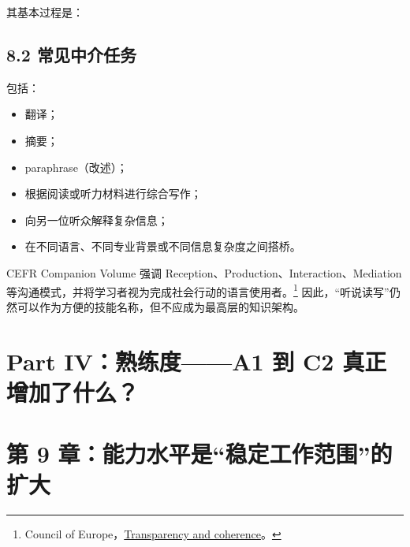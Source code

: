 \documentclass[11pt,a4paper]{ctexart}
\begin{document}
其基本过程是：
\begin{center}
\end{center}

\subsection{8.2 常见中介任务}
包括：
\begin{itemize}
  \item 翻译；
  \item 摘要；
  \item paraphrase（改述）；
  \item 根据阅读或听力材料进行综合写作；
  \item 向另一位听众解释复杂信息；
  \item 在不同语言、不同专业背景或不同信息复杂度之间搭桥。
\end{itemize}

\begin{corebox}[语言活动的统一框架]
CEFR Companion Volume 强调 Reception、Production、Interaction、Mediation 等沟通模式，并将学习者视为完成社会行动的语言使用者。\footnote{Council of Europe，\href{https://www.coe.int/en/web/common-european-framework-reference-languages/transparency-and-coherence}{Transparency and coherence}。}
因此，“听说读写”仍然可以作为方便的技能名称，但不应成为最高层的知识架构。
\end{corebox}

\newpage
\section{Part IV：熟练度——A1 到 C2 真正增加了什么？}

\section{第 9 章：能力水平是“稳定工作范围”的扩大}
\end{document}
